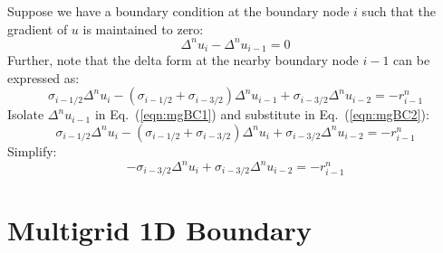 \documentclass{warpdoc}
\begin{document}
Suppose we have a boundary condition at the boundary node $i$ such that the gradient of $u$ is maintained to zero:
%
\begin{equation}
  \Delta^n u_i - \Delta^n u_{i-1} =0
\label{eqn:mgBC1}
\end{equation}
%
Further, note that the delta form at the nearby boundary node $i-1$ can be expressed as:
%
\begin{equation}
  \sigma_{i-1/2} \Delta^n u_{i} - (\sigma_{i-1/2}+\sigma_{i-3/2}) \Delta^n u_{i-1} +\sigma_{i-3/2}\Delta^n u_{i-2}
      = -r_{i-1}^n
\label{eqn:mgBC2}
\end{equation}
%
Isolate $\Delta^n u_{i-1}$ in Eq.\ (\ref{eqn:mgBC1}) and substitute in Eq.\ (\ref{eqn:mgBC2}):
%
\begin{equation}
  \sigma_{i-1/2} \Delta^n u_{i} - (\sigma_{i-1/2}+\sigma_{i-3/2}) \Delta^n u_{i} +\sigma_{i-3/2}\Delta^n u_{i-2}
      = -r_{i-1}^n
\end{equation}
%
Simplify:
%
\begin{equation}
   - \sigma_{i-3/2} \Delta^n u_{i} +\sigma_{i-3/2}\Delta^n u_{i-2}
      = -r_{i-1}^n
\end{equation}
%


\section{Multigrid 1D Boundary}
\end{document}

